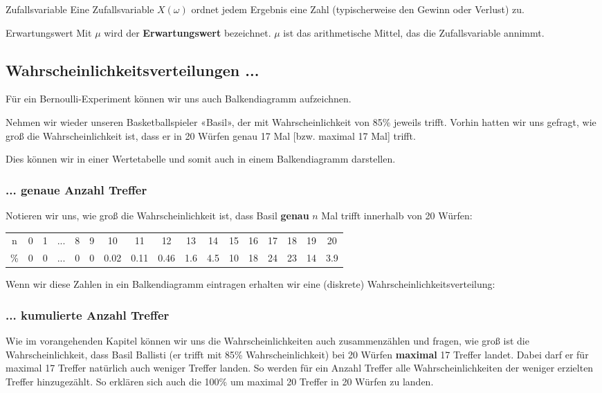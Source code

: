 \begin{definition}{Zufallsvariable}{}
	Eine Zufallsvariable $X(\omega)$ ordnet jedem Ergebnis eine Zahl
	(typischerweise den Gewinn oder Verlust) zu.
\end{definition}


\begin{definition}{Erwartungswert}{}
	Mit $\mu$ wird der \textbf{Erwartungswert} bezeichnet.
	$\mu$ ist das arithmetische Mittel, das die Zufallsvariable
	annimmt.
\end{definition}
\newpage



\subsection{Wahrscheinlichkeitsverteilungen ...}

Für ein Bernoulli-Experiment können wir uns auch Balkendiagramm aufzeichnen.

Nehmen wir wieder unseren Basketballspieler «Basil», der mit Wahrscheinlichkeit von 85\% jeweils trifft. Vorhin hatten wir uns gefragt, wie groß die Wahrscheinlichkeit ist, dass er in 20 Würfen genau 17 Mal [bzw. maximal 17 Mal] trifft.

Dies können wir in einer Wertetabelle und somit auch in einem Balkendiagramm darstellen.
\newpage


\subsubsection{... genaue Anzahl Treffer}
Notieren wir uns, wie groß die Wahrscheinlichkeit ist, dass Basil \textbf{genau} $n$ Mal trifft innerhalb von 20 Würfen:

\begin{tabular}{c|cccccccccccccccc}
  n & 0 & 1 & ... & 8 & 9 & 10   & 11   & 12   & 13  & 14  & 15 & 16 & 17 & 18 & 19 &  20\\
  \%& 0 & 0 & ... & 0 & 0 & 0.02 & 0.11 & 0.46 & 1.6 & 4.5 & 10 & 18 & 24 & 23 & 14 & 3.9
\end{tabular}

Wenn wir diese Zahlen in ein Balkendiagramm eintragen erhalten wir
eine (diskrete) Wahrscheinlichkeitsverteilung:




\subsubsection{... kumulierte Anzahl Treffer}
Wie im vorangehenden Kapitel können wir uns die Wahrscheinlichkeiten
auch zusammenzählen und \zB fragen, wie groß ist die
Wahrscheinlichkeit, dass Basil Ballisti (er trifft mit 85\%
Wahrscheinlichkeit) bei 20 Würfen \textbf{maximal} 17
Treffer landet. Dabei darf er für maximal 17 Treffer natürlich auch
weniger Treffer landen. So werden für ein Anzahl Treffer alle
Wahrscheinlichkeiten der weniger erzielten Treffer hinzugezählt. So
erklären sich auch die 100\% um maximal 20 Treffer in 20 Würfen zu
landen.

